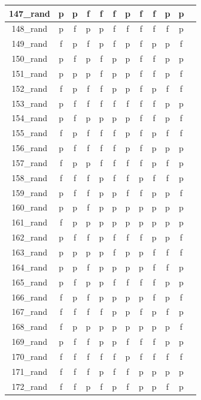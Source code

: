 \documentclass[
fancyheadings, %
%
%
]{stsreprt}
\begin{document}
\begin{longtable}{|c|c|c|c|c|c|c|c|c|c|c|c|}
\hline
147\_rand & p & p & f & f & f & p & f & f & p & p \\
\hline
148\_rand & p & f & p & p & f & f & f & f & f & p \\
\hline
149\_rand & f & p & f & p & f & p & f & p & p & f \\
\hline
150\_rand & p & f & p & f & p & p & f & f & p & p \\
\hline
151\_rand & p & p & p & f & p & p & f & f & p & f \\
\hline
152\_rand & f & p & f & f & p & p & f & p & f & f \\
\hline
153\_rand & p & f & f & f & f & f & f & f & p & p \\
\hline
154\_rand & p & f & p & p & p & p & f & f & p & f \\
\hline
155\_rand & f & p & f & f & f & p & f & p & f & f \\
\hline
156\_rand & p & f & f & f & f & p & f & p & p & p \\
\hline
157\_rand & f & p & p & f & f & f & f & p & f & p \\
\hline
158\_rand & f & f & f & p & f & f & p & f & f & p \\
\hline
159\_rand & p & f & f & p & p & f & f & p & p & f \\
\hline
160\_rand & p & p & f & p & p & p & p & p & p & p \\
\hline
161\_rand & f & p & p & p & p & p & p & p & p & p \\
\hline
162\_rand & p & f & f & p & f & f & f & p & p & f \\
\hline
163\_rand & p & p & p & p & f & p & p & f & f & f \\
\hline
164\_rand & p & p & f & p & p & p & p & f & f & p \\
\hline
165\_rand & p & f & p & p & f & f & f & f & p & p \\
\hline
166\_rand & f & p & f & p & p & p & p & f & p & f \\
\hline
167\_rand & f & f & f & f & p & p & f & p & f & p \\
\hline
168\_rand & f & p & p & p & p & p & p & p & p & f \\
\hline
169\_rand & p & f & f & p & p & f & f & f & p & p \\
\hline
170\_rand & f & f & f & f & f & p & f & f & f & f \\
\hline
171\_rand & f & f & f & p & f & f & p & p & p & p \\
\hline
172\_rand & f & f & p & f & p & f & p & p & f & p \\

\end{longtable}
\end{document}
